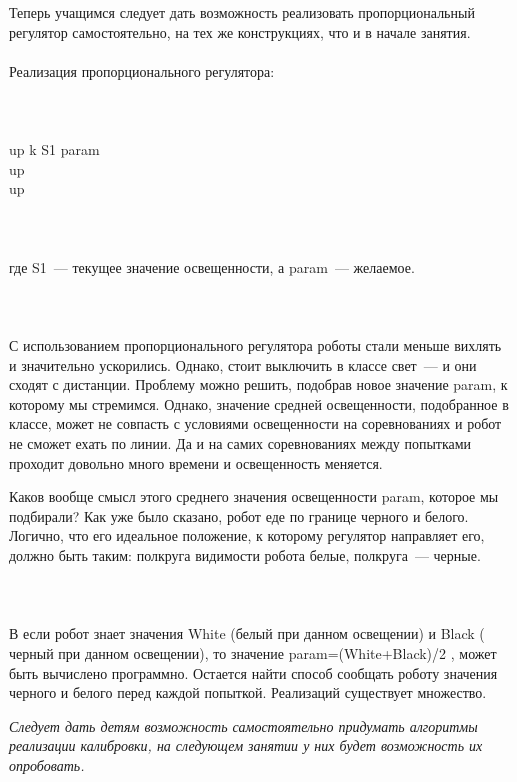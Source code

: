 Теперь учащимся следует дать возможность реализовать пропорциональный регулятор самостоятельно, на тех же конструкциях, что и в начале занятия.\\\\
Реализация пропорционального регулятора:\\\\

{\programm
	{\slshape{}}\\
	\rC{\{}\\
	\indent up \rC{=} k \rC{* (}S1 \rC{- } param\rC{);}\\
	\indent{} up\rC{;}\\
	\indent{} up\rC{;}\\
	\rC{\}}\\
}\\\\

где S1~--- текущее значение освещенности, а param~--- желаемое.\\\\

{\hypertarget{lesson16x5}{}}\\\\

С использованием пропорционального регулятора роботы стали меньше вихлять и значительно ускорились. Однако, стоит выключить в классе свет~--- и они сходят с дистанции. Проблему можно решить, подобрав новое значение param, к которому мы стремимся. Однако, значение средней освещенности, подобранное в классе, может не совпасть с условиями освещенности на соревнованиях и робот не сможет ехать по линии. Да и на самих соревнованиях между попытками проходит довольно много времени и освещенность меняется. 

Каков вообще смысл этого среднего значения освещенности param, которое мы подбирали? Как уже было сказано, робот еде по границе черного и белого. Логично, что  его идеальное положение, к которому регулятор направляет его, должно быть таким: полкруга видимости робота белые, полкруга~--- черные.\\\\

\\\\

В если робот знает значения White (белый при данном освещении) и Black ( черный при данном освещении), то значение param=(White+Black)/2 , может быть вычислено программно. Остается найти способ сообщать роботу значения черного и белого перед каждой попыткой.  Реализаций существует множество.

{\slshape Следует дать детям возможность самостоятельно придумать алгоритмы реализации калибровки, на следующем занятии у них будет возможность их опробовать.}
